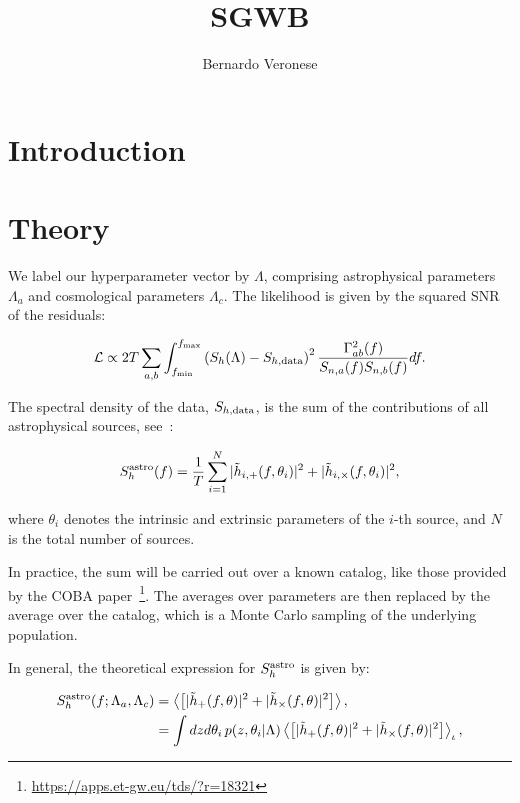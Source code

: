 \documentclass{article}
\title{SGWB}
\author{Bernardo Veronese}
\begin{document}
\maketitle

\section{Introduction}

\section{Theory}

We label our hyperparameter vector by $\Lambda$, comprising astrophysical
parameters $\Lambda_a$ and cosmological parameters $\Lambda_c$. The likelihood
is given by the squared SNR of the residuals:

\begin{equation}
	\mathcal{L} \propto 2T \sum_{a,b}\int_{f_{\rm{min}}}^{f_{\rm{max}}} \left(S_h(\Lambda) - S_{h,\rm{data}}\right)^2 \frac{\Gamma^2_{ab}(f)}{S_{n,a}(f)S_{n,b}(f)} df.
	\label{eq:likelihood}
\end{equation}

The spectral density of the data, $S_{h,\rm{data}}$, is the sum of the
contributions of all astrophysical sources, see~\cite{Belgacem:2024ohp}:

\begin{equation}
	S_h^{\rm{astro}}(f) = \frac{1}{T} \sum_{i=1}^{N} |\tilde{h}_{i,+}(f, \theta_i)|^2 + |\tilde{h}_{i,\times}(f, \theta_i)|^2,
	\label{eq:data-spectral-density}
\end{equation}

where $\theta_i$ denotes the intrinsic and extrinsic parameters of the $i$-th
source, and $N$ is the total number of sources.

In practice, the sum will be carried out over a known catalog, like those
provided by the COBA
paper~\cite{Branchesi:2023mws}\footnote{\url{https://apps.et-gw.eu/tds/?r=18321}}.
The averages over parameters are then replaced by the average over the catalog,
which is a Monte Carlo sampling of the underlying population.

In general, the theoretical expression for $S_h^{\rm{astro}}$ is given by:

\begin{equation}
	\begin{aligned}
		S_h^{\rm{astro}}(f; \Lambda_a, \Lambda_c) & = \left \langle \left[|\tilde{h}_{+}(f, \theta)|^2 + |\tilde{h}_{\times}(f, \theta)|^2\right] \right \rangle,                                                       \\
		                                          & = \int dz d\theta_i \, p(z, \theta_i | \Lambda) \left \langle \left[|\tilde{h}_{+}(f, \theta)|^2 + |\tilde{h}_{\times}(f, \theta)|^2\right] \right \rangle_{\iota},
	\end{aligned}
	\label{eq:theoretical-spectral-density}
\end{equation}
\end{document}

